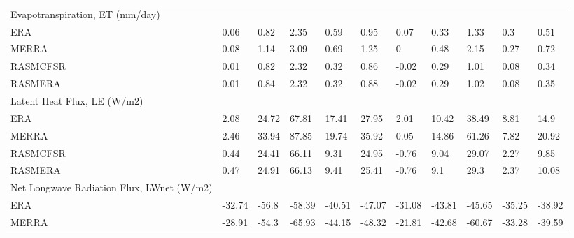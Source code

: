 \begin{table}[]
{\begin{tabular}{lllllllllll}
Evapotranspiration, ET (mm/day)                &                              &        &        &        &        &        &        &        &        &        \\
ERA                                            & 0.06                         & 0.82   & 2.35   & 0.59   & 0.95   & 0.07   & 0.33   & 1.33   & 0.3    & 0.51   \\
MERRA                                          & 0.08                         & 1.14   & 3.09   & 0.69   & 1.25   & 0      & 0.48   & 2.15   & 0.27   & 0.72   \\
RASMCFSR                                       & 0.01                         & 0.82   & 2.32   & 0.32   & 0.86   & -0.02  & 0.29   & 1.01   & 0.08   & 0.34   \\
RASMERA                                        & 0.01                         & 0.84   & 2.32   & 0.32   & 0.88   & -0.02  & 0.29   & 1.02   & 0.08   & 0.35   \\
Latent Heat Flux, LE (W/m2)                    &                              &        &        &        &        &        &        &        &        &        \\
ERA                                            & 2.08                         & 24.72  & 67.81  & 17.41  & 27.95  & 2.01   & 10.42  & 38.49  & 8.81   & 14.9   \\
MERRA                                          & 2.46                         & 33.94  & 87.85  & 19.74  & 35.92  & 0.05   & 14.86  & 61.26  & 7.82   & 20.92  \\
RASMCFSR                                       & 0.44                         & 24.41  & 66.11  & 9.31   & 24.95  & -0.76  & 9.04   & 29.07  & 2.27   & 9.85   \\
RASMERA                                        & 0.47                         & 24.91  & 66.13  & 9.41   & 25.41  & -0.76  & 9.1    & 29.3   & 2.37   & 10.08  \\
Net Longwave Radiation Flux, LWnet (W/m2)      &                              &        &        &        &        &        &        &        &        &        \\
ERA                                            & -32.74                       & -56.8  & -58.39 & -40.51 & -47.07 & -31.08 & -43.81 & -45.65 & -35.25 & -38.92 \\
MERRA                                          & -28.91                       & -54.3  & -65.93 & -44.15 & -48.32 & -21.81 & -42.68 & -60.67 & -33.28 & -39.59 \\

\end{tabular}}
\end{table}
